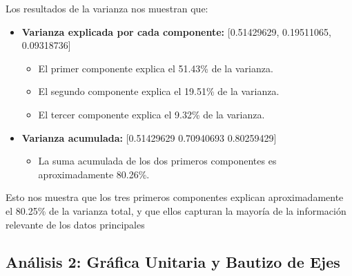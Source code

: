 Los resultados de la varianza nos muestran que:    
\begin{itemize}
    \item \textbf{Varianza explicada por cada componente:} [0.51429629, 0.19511065, 0.09318736]
    \begin{itemize}
        \item El primer componente explica el 51.43\% de la varianza.
        \item El segundo componente explica el 19.51\% de la varianza.
        \item El tercer componente explica el 9.32\% de la varianza.
    \end{itemize}

    \item \textbf{Varianza acumulada:} [0.51429629 0.70940693 0.80259429]
    \begin{itemize}
        \item La suma acumulada de los dos primeros componentes es aproximadamente 80.26\%.
    \end{itemize}
\end{itemize}

Esto nos muestra que los tres primeros componentes explican aproximadamente el 80.25\% de la varianza total,
y que ellos capturan la mayoría de la información relevante de los datos principales


\subsection{Análisis 2: Gráfica Unitaria y Bautizo de Ejes}